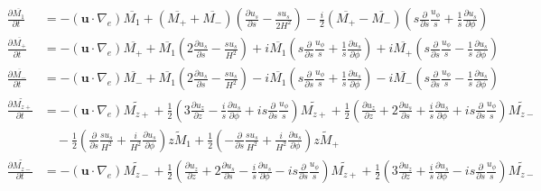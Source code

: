 \begin{align*}
    \frac{\partial \overline{M_1}}{\partial t} &= - \left(\mathbf{u}\cdot \nabla_e \right) \overline{M_1} + \left(\overline{M_+} + \overline{M_-}\right) \left(\frac{\partial u_s}{\partial s} - \frac{su_s}{2H^2}\right) - \frac{i}{2} \left(\overline{M_+} - \overline{M_-}\right) \left(s \frac{\partial}{\partial s}\frac{u_\phi}{s} + \frac{1}{s}\frac{\partial u_s}{\partial \phi}\right) \\
    \frac{\partial \overline{M_+}}{\partial t} &= - \left(\mathbf{u}\cdot \nabla_e \right) \overline{M_+} + \overline{M_1} \left(2\frac{\partial u_s}{\partial s} - \frac{su_s}{H^2}\right) + i\overline{M_1} \left(s \frac{\partial}{\partial s}\frac{u_\phi}{s} + \frac{1}{s}\frac{\partial u_s}{\partial \phi}\right) + i \overline{M_+} \left(s \frac{\partial}{\partial s}\frac{u_\phi}{s} - \frac{1}{s}\frac{\partial u_s}{\partial \phi}\right) \\ 
    \frac{\partial \overline{M_-}}{\partial t} &= - \left(\mathbf{u}\cdot \nabla_e \right) \overline{M_-} + \overline{M_1} \left(2\frac{\partial u_s}{\partial s} - \frac{su_s}{H^2}\right) - i\overline{M_1} \left(s \frac{\partial}{\partial s}\frac{u_\phi}{s} + \frac{1}{s}\frac{\partial u_s}{\partial \phi}\right) - i \overline{M_-} \left(s \frac{\partial}{\partial s}\frac{u_\phi}{s} - \frac{1}{s}\frac{\partial u_s}{\partial \phi}\right) \\ 
    \frac{\partial \widetilde{M_{z+}}}{\partial t} &= - (\mathbf{u}\cdot \nabla_e) \widetilde{M_{z+}} + \frac{1}{2}\left(3 \frac{\partial u_z}{\partial z} - \frac{i}{s}\frac{\partial u_s}{\partial \phi} + is \frac{\partial}{\partial s}\frac{u_\phi}{s}\right) \widetilde{M_{z+}} + \frac{1}{2} \left(\frac{\partial u_z}{\partial z} + 2 \frac{\partial u_s}{\partial s} + \frac{i}{s} \frac{\partial u_s}{\partial \phi} + is \frac{\partial}{\partial s}\frac{u_\phi}{s}\right) \widetilde{M_{z-}} \\
    &\quad -\frac{1}{2} \left(\frac{\partial}{\partial s} \frac{su_s}{H^2} + \frac{i}{H^2} \frac{\partial u_s}{\partial \phi}\right) \widetilde{zM_1} + \frac{1}{2} \left(-\frac{\partial}{\partial s}\frac{su_s}{H^2} + \frac{i}{H^2}\frac{\partial u_s}{\partial \phi}\right) \widetilde{zM_+} \\
    \frac{\partial \widetilde{M_{z-}}}{\partial t} &= - (\mathbf{u}\cdot \nabla_e) \widetilde{M_{z-}} + \frac{1}{2} \left(\frac{\partial u_z}{\partial z} + 2 \frac{\partial u_s}{\partial s} - \frac{i}{s} \frac{\partial u_s}{\partial \phi} - is \frac{\partial}{\partial s}\frac{u_\phi}{s}\right) \widetilde{M_{z+}} + \frac{1}{2}\left(3 \frac{\partial u_z}{\partial z} + \frac{i}{s}\frac{\partial u_s}{\partial \phi} - is \frac{\partial}{\partial s}\frac{u_\phi}{s}\right) \widetilde{M_{z-}} \\

\end{align*}
